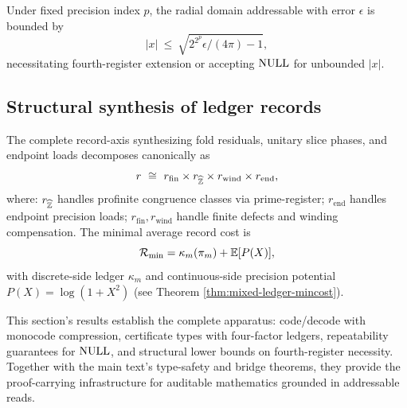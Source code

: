 \begin{corollary}\label{cor:cc-radial-prime-budget}
Under fixed precision index $p$, the radial domain addressable with error $\epsilon$ is bounded by
$$
|x|\ \le\ \sqrt{2^{2^p}\epsilon/(4\pi)-1},
$$
necessitating fourth-register extension or accepting $\mathrm{NULL}$ for unbounded $|x|$.
\end{corollary}

\subsection{Structural synthesis of ledger records}
\begin{theorem}\label{thm:cc-four-factor-synthesis}
The complete record-axis synthesizing fold residuals, unitary slice phases, and endpoint loads decomposes canonically as
$$
r\ \cong\ r_{\mathrm{fin}} \times r_{\widehat{\ZZ}} \times r_{\mathrm{wind}} \times r_{\mathrm{end}},
$$
where: $r_{\widehat{\mathbb{Z}}}$ handles profinite congruence classes via prime-register; $r_{\mathrm{end}}$ handles endpoint precision loads; $r_{\mathrm{fin}}, r_{\mathrm{wind}}$ handle finite defects and winding compensation. The minimal average record cost is
$$
\mathcal{R}_{\min} = \kappa_m(\pi_m) + \mathbb{E}[P(X)],
$$
with discrete-side ledger $\kappa_m$ and continuous-side precision potential $P(X)=\log(1+X^2)$ (see Theorem \ref{thm:mixed-ledger-mincost}).
\end{theorem}

This section's results establish the complete apparatus: code/decode with monocode compression, certificate types with four-factor ledgers, repeatability guarantees for $\mathrm{NULL}$, and structural lower bounds on fourth-register necessity. Together with the main text's type-safety and bridge theorems, they provide the proof-carrying infrastructure for auditable mathematics grounded in addressable reads.
